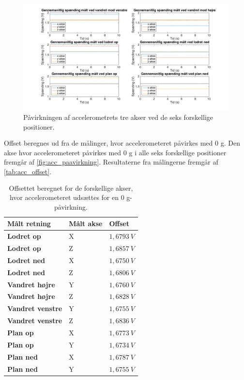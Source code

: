 \begin{figure}[H]
\centering
\includegraphics[width=1.0\textwidth]{figures/paavirkning}
\caption{Påvirkningen af accelerometrets tre akser ved de seks forskellige positioner.}
\label{fig:acc_paavirkning2}
\end{figure}

Offset beregnes ud fra de målinger, hvor accelerometeret påvirkes med 0 g. Den akse hvor accelerometeret påvirkes med 0 g i alle seks forskellige positioner fremgår af \autoref{fig:acc_paavirkning}. Resultaterne fra målingerne fremgår af \autoref{tab:acc_offset}. 

\begin{table}[H]
	\centering
	\begin{tabular}{|l|l|l|}
	\textbf{Målt retning} & \textbf{Målt akse} & \textbf{Offset} \\ \hline
    \textbf{Lodret op} 		& X 		& $1,6793~V$ 	\\ \hline
    \textbf{Lodret op} 		& Z 		& $1,6857~V$ 	 \\ \hline
    \textbf{Lodret ned}		& X 		& $1,6750~V$ 	\\ \hline
    \textbf{Lodret ned}		& Z 		& $1,6806~V$  	\\ \hline
    \textbf{Vandret højre} 	& Y 		& $1,6760~V$    \\ \hline     
    \textbf{Vandret højre} 	& Z 		& $1,6828~V$ 	\\ \hline
    \textbf{Vandret venstre}	& Y 		& $1,6755~V$ 	\\ \hline
    \textbf{Vandret venstre}	& Z 		& $1,6836~V$		\\ \hline
    \textbf{Plan op} 		& X 		& $1,6773~V$		\\ \hline		
    \textbf{Plan op} 		& Y 		& $1,6734~V$    \\ \hline
    \textbf{Plan ned} 		& X 		& $1,6787~V$		\\ \hline
    \textbf{Plan ned} 		& Y 		& $1,6755~V$		\\ \hline
	\end{tabular}
	\caption{Offsettet beregnet for de forskellige akser, hvor accelerometeret udsættes for en 0 g-påvirkning.}
	\label{tab:acc_offset}
\end{table}

